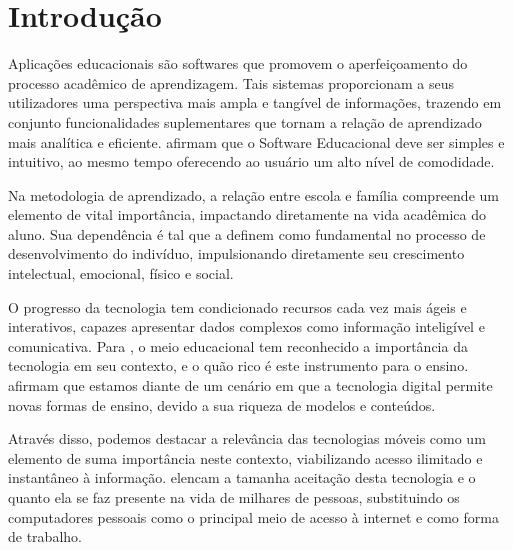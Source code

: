 

\setlength{\afterchapskip}{1.5cm minus \baselineskip}


\chapter{Introdução}
\label{cha:motivacao}
Aplicações educacionais são softwares que promovem o aperfeiçoamento do processo acadêmico de aprendizagem. Tais sistemas proporcionam a seus utilizadores uma perspectiva mais ampla e tangível de informações, trazendo em conjunto funcionalidades suplementares que tornam a relação de aprendizado mais analítica e eficiente.  afirmam que o Software Educacional deve ser simples e intuitivo, ao mesmo tempo oferecendo ao usuário um alto nível de comodidade.

Na metodologia de aprendizado, a relação entre escola e família compreende um elemento de vital importância, impactando diretamente na vida acadêmica do aluno. Sua dependência é tal que  a definem como fundamental no processo de desenvolvimento do indivíduo, impulsionando diretamente seu crescimento intelectual, emocional, físico e social.

O progresso da tecnologia tem condicionado recursos cada vez mais ágeis e interativos, capazes apresentar dados complexos como informação inteligível e comunicativa. Para , o meio educacional tem reconhecido a importância da tecnologia em seu contexto, e o quão rico é este instrumento para o ensino.  afirmam que estamos diante de um cenário em que a tecnologia digital permite novas formas de ensino, devido a sua riqueza de modelos e conteúdos.

Através disso, podemos destacar a relevância das tecnologias móveis como um elemento de suma importância neste contexto, viabilizando acesso ilimitado e instantâneo à informação.  elencam a tamanha aceitação desta tecnologia e o quanto ela se faz presente na vida de milhares de pessoas, substituindo os computadores pessoais como o principal meio de acesso à internet e como forma de trabalho.


